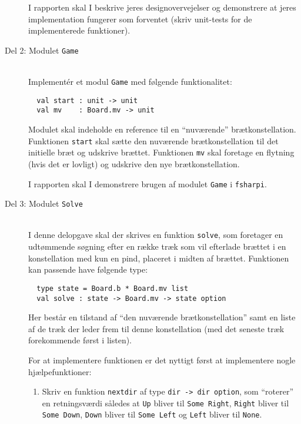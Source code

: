 \begin{description}
I rapporten skal I beskrive jeres designovervejelser og demonstrere at jeres implementation fungerer som forventet (skriv unit-tests for de implementerede funktioner).

\item[Del 2: Modulet \texttt{Game}]~\\

Implementér et modul \lstinline{Game} med følgende funktionalitet:
\begin{lstlisting}
  val start : unit -> unit
  val mv    : Board.mv -> unit
\end{lstlisting}

Modulet skal indeholde en reference til en ``nuværende'' brætkonstellation. Funktionen \lstinline{start} skal sætte den nuværende brætkonstellation til det initielle bræt og udskrive brættet. Funktionen \lstinline{mv} skal foretage en flytning (hvis det er lovligt) og udskrive den nye brætkonstellation.

I rapporten skal I demonstrere brugen af modulet \lstinline{Game}
i \texttt{fsharpi}.

\item[Del 3: Modulet \texttt{Solve}]~\\

  I denne delopgave skal der skrives en funktion \lstinline{solve}, som foretager en udtømmende søgning efter en række træk som vil efterlade brættet i en konstellation med kun en pind, placeret i midten af brættet. Funktionen kan passende have følgende type:
\begin{lstlisting}
  type state = Board.b * Board.mv list
  val solve : state -> Board.mv -> state option
\end{lstlisting}

Her består en tilstand af ``den nuværende brætkonstellation'' samt en liste af de træk der leder frem til denne konstellation (med det seneste træk forekommende først i listen).

For at implementere funktionen er det nyttigt først at implementere nogle hjælpefunktioner:

\begin{enumerate}
\item Skriv en funktion \lstinline{nextdir} af type \lstinline{dir -> dir option}, som ``roterer'' en retningsværdi således at \lstinline{Up} bliver til \lstinline{Some Right}, \lstinline{Right} bliver til \lstinline{Some Down}, \lstinline{Down} bliver til \lstinline{Some Left} og \lstinline{Left} bliver til \lstinline{None}.


\end{enumerate}
\end{description}
